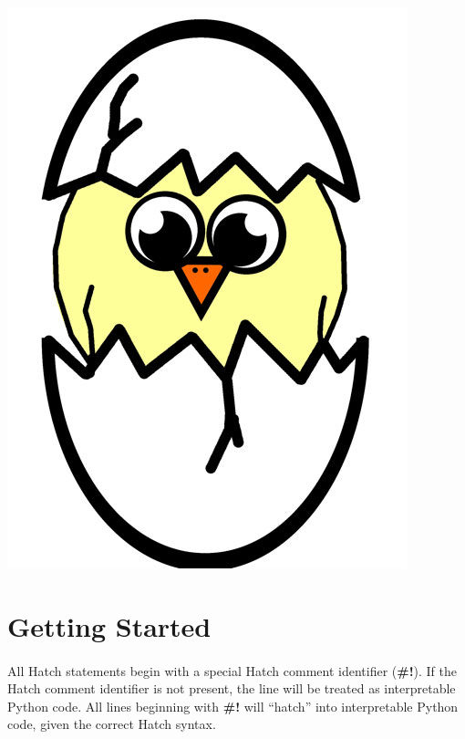 \documentclass[12pt]{article}
\begin{document}
\maketitle
\begin{center}
\includegraphics[scale=0.45]{./images/hatchchick.JPG}
\end{center}
\pagebreak

\section{Getting Started}
\paragraph{} All Hatch statements begin with a special Hatch comment identifier (\textbf{\#!}).  If the Hatch comment identifier is not present, the line will be treated as interpretable Python code.  All lines beginning with \textbf{\#!} will ``hatch'' into interpretable Python code, given the correct Hatch syntax.
\end{document}
